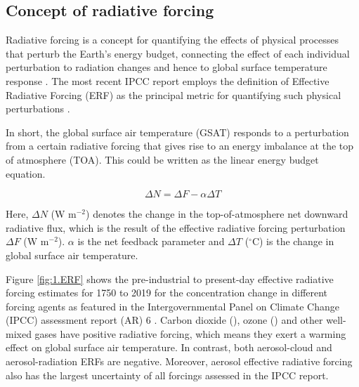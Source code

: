 \subsection{Concept of radiative forcing}

Radiative forcing is a concept for quantifying the effects of physical processes that perturb the Earth's energy budget, connecting the effect of each individual perturbation to radiation changes and hence to global surface temperature response \citep{thornhillEffectiveRadiativeForcing2021}. The most recent IPCC report employs the definition of Effective Radiative Forcing (ERF) as the principal metric for quantifying such physical perturbations \citep{forsterEarthEnergyBudget2021}. 

In short, the global surface air temperature (GSAT) responds to a perturbation from a certain radiative forcing that gives rise to an energy imbalance at the top of atmosphere (TOA). This could be written as the linear energy budget equation.

\begin{equation}
\label{eq:erf}
    \Delta N = \Delta F - \alpha \Delta T
\end{equation}

Here, $\Delta N$ (W m$^{-2}$) denotes the change in the top-of-atmosphere net downward radiative flux, which is the result of the effective radiative forcing perturbation $\Delta F$ (W m$^{-2}$). $\alpha$ is the net feedback parameter and $\Delta T$ ($^\circ$C) is the change in global surface air temperature. 

Figure \ref{fig:1.ERF} shows the pre-industrial to present-day effective radiative forcing estimates for 1750 to 2019 for the concentration change in different forcing agents as featured in the Intergovernmental Panel on Climate Change (IPCC) assessment report (AR) 6 \citep{forsterEarthEnergyBudget2021}. Carbon dioxide (), ozone () and other well-mixed gases have positive radiative forcing, which means they exert a warming effect on global surface air temperature. In contrast, both aerosol-cloud and aerosol-radiation ERFs are negative. Moreover, aerosol effective radiative forcing also has the largest uncertainty of all forcings assessed in the IPCC report.


